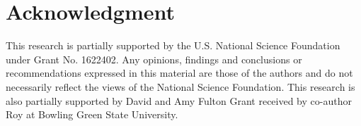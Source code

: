 \vspace{-.15in}
\section{Acknowledgment}
\label{sec:ack}
\vspace{-.05in}

This research is partially supported by the U.S. National Science Foundation under 
Grant No. 1622402. Any opinions, findings and conclusions or recommendations
expressed in this material are those of the authors and do not necessarily reflect 
the views of the National Science Foundation. This research is also partially supported by 
David and Amy Fulton Grant received by co-author Roy at Bowling Green State University.


